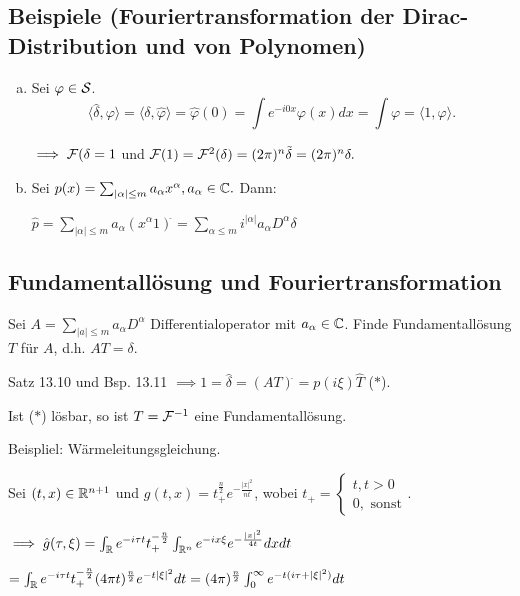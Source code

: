 \subsection{Beispiele (Fouriertransformation der Dirac-Distribution und von Polynomen)}

\begin{enumerate}[a)]
  \item Sei $\varphi \in \mathcal{S}$. 
    $$
    \langle \hat \delta, \varphi \rangle = \langle \delta, \hat \varphi \rangle = \hat\varphi(0) =  \int e^{-i0x}\varphi(x) dx = \int \varphi = \langle 1, \varphi \rangle.
    $$

    $\implies \mathcal{F}(\delta = 1$ und $\mathcal{F}(1) = \mathcal{F}^2(\delta) = (2\pi)^n \tilde \delta = (2\pi)^n \delta.$

  \item Sei $p(x) = \sum_{|\alpha| \leq m} a_\alpha x^\alpha, a_\alpha \in \mathbb{C}.$ Dann:

    $\hat p = \sum_{|\alpha| \leq m} a_\alpha (x^\alpha 1)^{\hat{}} = \sum_{\alpha \leq m} i^{|\alpha|} a_\alpha D^\alpha \delta$

\end{enumerate}

\subsection{Fundamentallösung und Fouriertransformation}

Sei $A = \sum_{|a| \leq m} a_\alpha D^\alpha$ Differentialoperator mit $a_\alpha \in \mathbb{C}$.
Finde Fundamentallösung $T$ für $A$, d.h. $AT = \delta$.

Satz 13.10 und Bsp. 13.11 $\implies 1 = \hat \delta = (AT)^{\hat{}} = p(i\xi) \hat T$ ($\ast$).

Ist ($\ast$) lösbar, so ist $T = \mathcal{F}^{-1}$ eine Fundamentallösung.

Beispliel: Wärmeleitungsgleichung.

Sei $(t, x) \in \mathbb{R}^{n+1}$ und $g(t,x) = t_+^{\frac{n}{2}} e^{-\frac{|x|^2}{nt}}$, wobei $t_+ = \begin{cases} t, t>0 \\ 0, \text{ sonst}\end{cases}$.

$\implies \hat g(\tau, \xi) = \int_{\mathbb{R}} e^{-i\tau t} t_+^{-\frac{n}{2}} \int_{\mathbb{R}^n} e^{-ix\xi} e^{-\frac{|x|^2}{4 t}} dx dt$

$ = \int_{\mathbb{R}} e^{-i\tau t} t_+^{-\frac{n}{2}} (4 \pi t)^{\frac{n}{2}} e^{-t |\xi|^2} dt = (4 \pi)^{\frac{n}{2}} \int_0^\infty e^{-t(i\tau + |\xi|^2)} dt$

